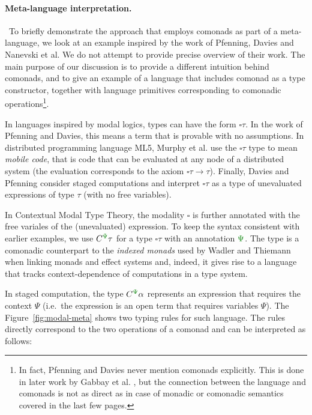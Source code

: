 
\paragraph{Meta-language interpretation.} ~To briefly demonstrate the app\-roach that employs comonads
as part of a meta-language, we look at an example inspired by the work of Pfenning, Davies and 
Nanevski et al. We do not attempt to provide precise overview of their work. The main purpose 
of our discussion is to provide a different intuition behind comonads, and to give an example
of a language that includes comonad as a type constructor, together with language primitives
corresponding to comonadic operations\footnote{In fact, Pfenning and Davies \cite{logic-modal-reconstruction,logic-cmtt}
never mention comonads explicitly. This is done in later work by Gabbay et al. \cite{logic-cmtt-semantics}, 
but the connection between the language and comonads is not as direct as in case of monadic or
comonadic semantics covered in the last few pages.}. 

In languages inspired by modal logics, types can have the form $\square \tau$. In the work of
Pfenning and Davies, this means a term that is provable with no assumptions. In distributed 
programming language ML5, Murphy et al. \cite{app-distributed-ml5,logic-distributed-calculus} use the 
$\square \tau$ type to mean \emph{mobile code}, that is code that can be evaluated at any node of a 
distributed system (the evaluation corresponds to the axiom $\square \tau \rightarrow \tau$). 
Finally, Davies and Pfenning \cite{logic-modal-staged} consider staged computations and interpret 
$\square \tau$ as a type of unevaluated expressions of type $\tau$ (with no free variables).

In Contextual Modal Type Theory, the modality $\square$ is further annotated with the free variales
of the (unevaluated) expression. To keep the syntax consistent with earlier examples, we use 
$\ctyp{\cclrd{\Psi}}{\tau}$ for a type $\square \tau$ with an annotation $\cclrd{\Psi}$. The type 
is a comonadic counterpart to the \emph{indexed monads} used by Wadler and Thiemann when linking 
monads and effect systems and, indeed, it gives rise to a language that tracks context-dependence 
of computations in a type system.

In staged computation, the type $\ctyp{\cclrd{\Psi}}{\alpha}$ represents an expression 
that requires the context $\Psi$ (i.e.~the expression is an open term that requires variables $\Psi$).
The Figure~\ref{fig:modal-meta} shows two typing rules for such language. The rules directly
correspond to the two operations of a comonad and can be interpreted as follows:

